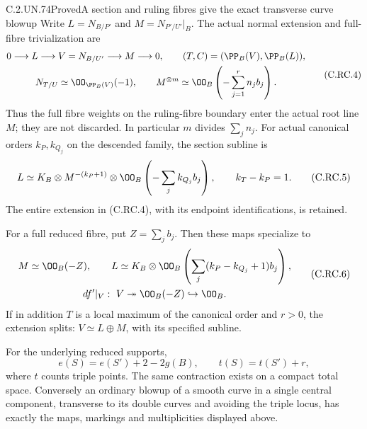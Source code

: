 \begin{statement}{C.2.UN.74}{Proved}{A section and ruling fibres give the exact transverse curve blowup}
Write
$L=N_{B/P'}$ and $M=N_{P'/U'}|_B$.
The actual normal extension and full-fibre
trivialization are
\[
 \begin{gathered}
 0\longrightarrow L\longrightarrow
       V=N_{B/U'}\longrightarrow M\longrightarrow0,
 \qquad (T,C)=(\PP_B(V),\PP_B(L)),\\
 N_{T/U}\simeq\OO_{\PP_B(V)}(-1),\qquad
 M^{\otimes m}\simeq
             \OO_B\left(-\sum_{j=1}^r n_jb_j\right).
 \end{gathered}
\tag{C.RC.4}
\]
Thus the full fibre weights on the ruling-fibre
boundary enter the actual root line $M$; they are
not discarded. In particular $m$ divides
$\sum_jn_j$. For actual canonical orders $k_P,k_{Q_j}$
on the descended family, the section subline is
\[
 L\simeq K_B\otimes M^{-(k_P+1)}
                    \otimes\OO_B\left(-\sum_jk_{Q_j}b_j\right),
             \qquad k_T-k_P=1.
\tag{C.RC.5}
\]
The entire extension in (C.RC.4), with its endpoint
identifications, is retained.

For a full reduced fibre, put $Z=\sum_jb_j$. Then
these maps specialize to
\[
 \begin{gathered}
 M\simeq\OO_B(-Z),\qquad
 L\simeq K_B\otimes
              \OO_B\left(\sum_j(k_P-k_{Q_j}+1)b_j\right),\\
 df'|_V:\ V\twoheadrightarrow
            \OO_B(-Z)\hookrightarrow\OO_B.
 \end{gathered}
\tag{C.RC.6}
\]
If in addition $T$ is a local maximum of the
canonical order and $r>0$, the extension splits:
$V\simeq L\oplus M$, with its specified subline.

For the underlying reduced supports,
\[
              e(S)=e(S')+2-2g(B),\qquad
              t(S)=t(S')+r,
\tag{C.RC.7}
\]
where $t$ counts triple points. The same contraction
exists on a compact total space. Conversely an
ordinary blowup of a smooth curve in a single
central component, transverse to its double curves
and avoiding the triple locus, has exactly the
maps, markings and multiplicities displayed above.
\end{statement}

